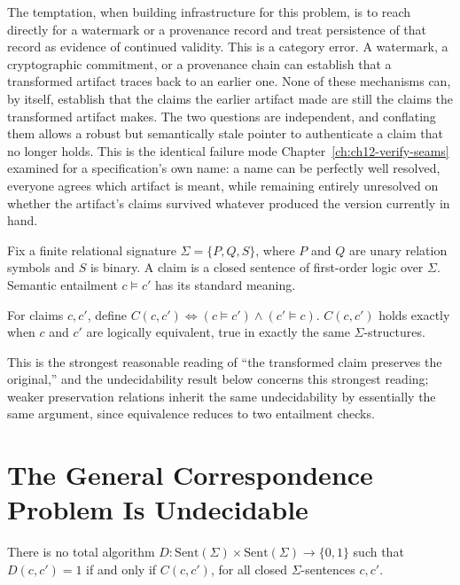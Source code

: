 The temptation, when building infrastructure for this problem, is to reach directly for a watermark or a provenance record \cite{dathathri2024,w3c_prov,c2pa} and treat persistence of that record as evidence of continued validity. This is a category error. A watermark, a cryptographic commitment, or a provenance chain can establish that a transformed artifact traces back to an earlier one. None of these mechanisms can, by itself, establish that the claims the earlier artifact made are still the claims the transformed artifact makes. The two questions are independent, and conflating them allows a robust but semantically stale pointer to authenticate a claim that no longer holds. This is the identical failure mode Chapter~\ref{ch:ch12-verify-seams} examined for a specification's own name: a name can be perfectly well resolved, everyone agrees which artifact is meant, while remaining entirely unresolved on whether the artifact's claims survived whatever produced the version currently in hand.

Fix a finite relational signature $\Sigma = \{P,Q,S\}$, where $P$ and $Q$ are unary relation symbols and $S$ is binary. A claim is a closed sentence of first-order logic over $\Sigma$. Semantic entailment $c \models c'$ has its standard meaning.

\begin{definition}[Correspondence]
For claims $c, c'$, define $C(c,c') \iff (c \models c') \land (c' \models c)$. $C(c,c')$ holds exactly when $c$ and $c'$ are logically equivalent, true in exactly the same $\Sigma$-structures.
\end{definition}

This is the strongest reasonable reading of ``the transformed claim preserves the original,'' and the undecidability result below concerns this strongest reading; weaker preservation relations inherit the same undecidability by essentially the same argument, since equivalence reduces to two entailment checks.

\section{The General Correspondence Problem Is Undecidable}

\begin{theorem}
\label{thm:correspondence-undecidable}
There is no total algorithm $D : \mathrm{Sent}(\Sigma) \times \mathrm{Sent}(\Sigma) \to \{0,1\}$ such that $D(c,c') = 1$ if and only if $C(c,c')$, for all closed $\Sigma$-sentences $c, c'$.
\end{theorem}

